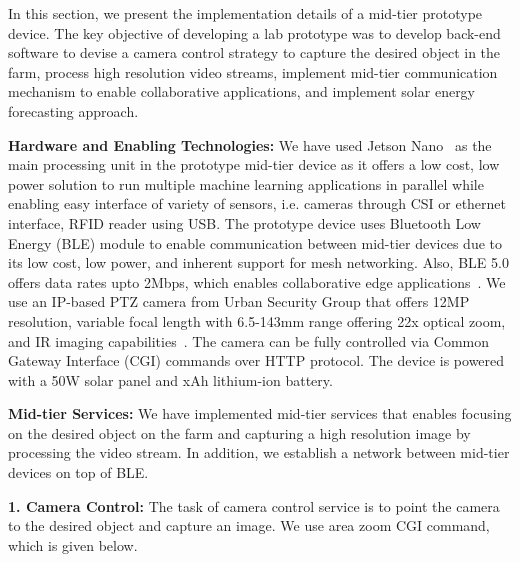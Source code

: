 In this section, we present the implementation details of a mid-tier prototype device. The key objective of developing a lab prototype was to develop back-end software to devise a camera control strategy to capture the desired object in the farm, process high resolution video streams, implement mid-tier communication mechanism to enable collaborative applications, and implement solar energy forecasting approach. 

\noindent
\textbf{Hardware and Enabling Technologies:} We have used Jetson Nano~\cite{jetson-nano} as the main processing unit in the prototype mid-tier device as it offers a low cost, low power solution to run multiple machine learning applications in parallel while enabling easy interface of variety of sensors, i.e. cameras through CSI or ethernet interface, RFID reader using USB. The prototype device uses Bluetooth Low Energy (BLE) module to enable communication between mid-tier devices due to its low cost, low power, and inherent support for mesh networking. Also, BLE 5.0 offers data rates upto 2Mbps, which enables collaborative edge applications~\cite{ble5}. 
We use an IP-based PTZ camera from Urban Security Group that offers 12MP resolution, variable focal length with 6.5-143mm range offering 22x optical zoom, and IR imaging capabilities~\cite{camera-link}. The camera can be fully controlled via Common Gateway Interface (CGI) commands over HTTP protocol. 
The device is powered with a 50W solar panel and xAh lithium-ion battery. 

\noindent
\textbf{Mid-tier Services:} We have implemented mid-tier services that enables focusing on the desired object on the farm and capturing a high resolution image by processing the video stream. In addition, we establish a network between mid-tier devices on top of BLE. 

\noindent
\textbf{1. Camera Control:} The task of camera control service is to point the camera to the desired object and capture an image. We use area zoom CGI command, which is given below. 

\vspace{0.5em}


